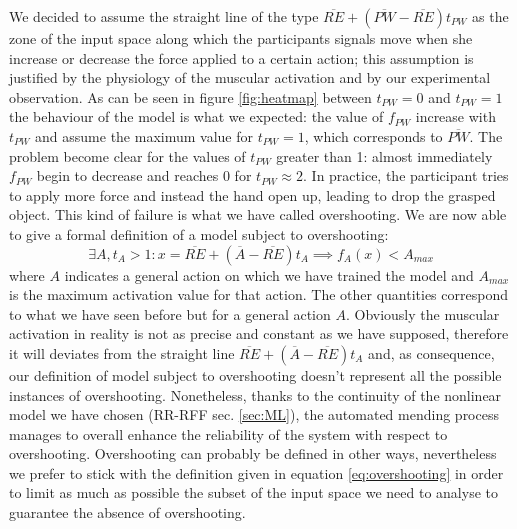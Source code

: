 We decided to assume the straight line of the type $\overline{RE} + (\overline{PW} - \overline{RE})t_{PW}$ as the zone of the input space along which the participants signals move when she increase or decrease the force applied to a certain action; this assumption is justified by the physiology of the muscular activation and by our experimental observation.
As can be seen in figure \ref{fig:heatmap} between $t_{PW} = 0$ and $t_{PW} = 1$ the behaviour of the model is what we expected: the value of $f_{PW}$ increase with $t_{PW}$ and assume the maximum value for $t_{PW} = 1$, which corresponds to $\overline{PW}$. The problem become clear for the values of $t_{PW}$ greater than 1: almost immediately $f_{PW}$ begin to decrease and reaches 0 for $t_{PW} \approx 2$. In practice, the participant tries to apply more force and instead the hand open up, leading to drop the grasped object. This kind of failure is what we have called overshooting.
We are now able to give a formal definition of a model subject to overshooting:
\begin{equation}
    \exists A,t_A>1 : x = \overline{RE} + (\overline{A} - \overline{RE})t_{A} \implies f_A(x) < A_{max}
    \label{eq:overshooting}
\end{equation}
where $A$ indicates a general action on which we have trained the model and $A_{max}$ is the maximum activation value for that action. The other quantities correspond to what we have seen before but for a general action $A$.
Obviously the muscular activation in reality is not as precise and constant as we have supposed, therefore it will deviates from the straight line $\overline{RE} + (\overline{A} - \overline{RE})t_{A}$ and, as consequence, our definition of model subject to overshooting doesn't represent all the possible instances of overshooting. Nonetheless, thanks to the continuity of the nonlinear model we have chosen (RR-RFF sec. \ref{sec:ML}), the automated mending process manages to overall enhance the reliability of the system with respect to overshooting.
Overshooting can probably be defined in other ways, nevertheless we prefer to stick with the definition given in equation \ref{eq:overshooting} in order to limit as much as possible the subset of the input space we need to analyse to guarantee the absence of overshooting.
%
%
%
